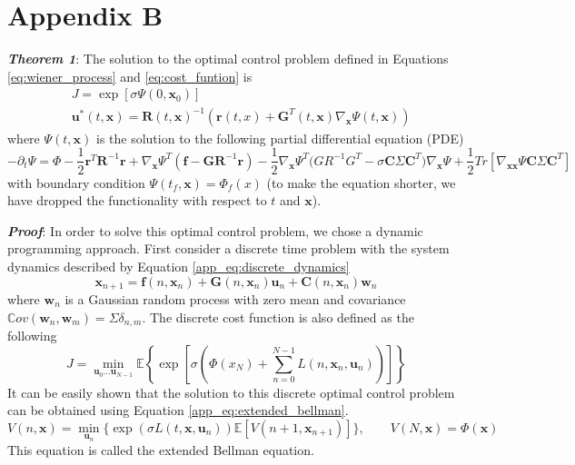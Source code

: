\documentclass[letterpaper, 10 pt, conference]{ieeeconf}
\newcommand{\vf}{\mathbf f}
\newcommand{\vr}{\mathbf r}
\newcommand{\vu}{\mathbf u}
\newcommand{\vw}{\mathbf w}
\newcommand{\vx}{\mathbf x}
\newcommand{\vC}{\mathbf C}
\newcommand{\vG}{\mathbf G}
\newcommand{\vR}{\mathbf R}
\begin{document}
\section{Appendix B} 
\textbf{\textit{Theorem 1}}: The solution to the optimal control problem defined
in Equations \eqref{eq:wiener_process} and \eqref{eq:cost_funtion} is
\begin{align}
& J = \exp \left[ \sigma \Psi(0,\vx_0) \right] \\
&\vu^*(t,\vx) =  \vR(t,\vx)^{-1} \left( \vr(t,x) + \vG^T(t,\vx) \nabla_{\vx}\Psi(t,\vx) \right)
\label{app_eq:optimal_control}
\end{align}
where $\Psi(t,\vx)$ is the solution to the following partial differential equation (PDE)
\begin{equation} \label{app_eq:nonlinear_utility_pde}
-\partial_t\Psi = \Phi -\frac{1}{2}\vr^T \vR^{-1} \vr + \nabla_{\vx}\Psi^T \left( \vf - \vG\vR^{-1}\vr \right) - \frac{1}{2} \nabla_{\vx}\Psi^T \big( GR^{-1}G^T - \sigma \vC\Sigma\vC^T \big) \nabla_{\vx}\Psi + \frac{1}{2} Tr [\nabla_{\vx\vx}\Psi \vC\Sigma\vC^T]
\end{equation}
with boundary condition $\Psi(t_f,\vx) = \Phi_f(x)$ (to make the equation
shorter, we have dropped the functionality with respect to $t$ and $\vx$).

\textbf{\textit{{Proof}}}: 
In order to solve this optimal control problem, we chose a dynamic programming
approach. First consider a discrete time problem with the system dynamics
described by Equation \eqref{app_eq:discrete_dynamics}
\begin{equation} \label{app_eq:discrete_dynamics}
\vx_{n+1}= \vf(n,\vx_n) + \vG(n,\vx_n)\vu_n  + \vC(n,\vx_n) \vw_n
\end{equation}
where $\vw_n$ is a Gaussian random process with zero mean and covariance
$\mathbb{C}ov(\vw_n,\vw_m) = \Sigma \delta_{n,m}$. The discrete cost function is
also defined as the following
\begin{equation} \label{app_eq:discrete_cost}
J = \min\limits_{ \vu_0 \dots \vu_{N-1}} \mathbb{E}\left\{ \exp\left[ \sigma \left(\Phi(x_N)+ \sum_{n=0}^{N-1} { L(n,\vx_n,\vu_n)}\right) \right] \right\}
\end{equation}
It can be easily shown that the solution to this discrete optimal control problem
can be obtained using Equation \eqref{app_eq:extended_bellman}.
\begin{equation} \label{app_eq:extended_bellman}
V(n,\vx) = \min\limits_{\vu_n} \Big\{\exp \left( \sigma L(t,\vx,\vu_n) \right) \mathbb{E} \left[V(n+1,\vx_{n+1})\right] \Big\},  \qquad V(N,\vx) = \Phi(\vx)
\end{equation}
This equation is called the extended Bellman equation. 
\end{document}
